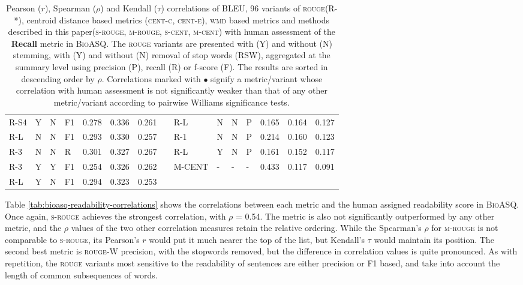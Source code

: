 \documentclass[11pt,a4paper]{article}
\newcommand{\rouge}{\textsc{rouge}\xspace}
\newcommand{\centc}{\textsc{cent-c}\xspace}
\newcommand{\cente}{\textsc{cent-e}\xspace}
\newcommand{\wmd}{\textsc{wmd}\xspace}
\newcommand{\bioasq}{\textsc{BioASQ}\xspace}
\newcommand{\srouge}{\textsc{s-rouge}\xspace}
\newcommand{\mrouge}{\textsc{m-rouge}\xspace}
\newcommand{\scent}{\textsc{s-cent}\xspace}
\newcommand{\mcent}{\textsc{m-cent}\xspace}
\begin{document}
\begin{table}[]
{\begin{tabular}{lllllllllllllll}
\textsc{R-S4} & Y & N & F1 & 0.278 & 0.336 & 0.261 &  & \textsc{R-L} & N & N & P & 0.165 & 0.164 & 0.127 \\
\textsc{R-L} & N & N & F1 & 0.293 & 0.330 & 0.257 &  & \textsc{R-1} & N & N & P & 0.214 & 0.160 & 0.123 \\
\textsc{R-3} & N & N & R & 0.301 & 0.327 & 0.267 &  & \textsc{R-L} & Y & N & P & 0.161 & 0.152 & 0.117 \\
\textsc{R-3} & Y & Y & F1 & 0.254 & 0.326 & 0.262 &  & \textsc{M-CENT} & - & - & - & 0.433 & 0.117 & 0.091 \\
\textsc{R-L} & Y & N & F1 & 0.294 & 0.323 & 0.253 &  &  &  &  &  &  &  &  \\ \hline
\end{tabular}
}
\caption{Pearson ($r$), Spearman ($\rho$) and Kendall ($\tau$) correlations of BLEU, 96 variants 
of \rouge (R-*), centroid distance based metrics (\centc, \cente), \wmd based metrics and 
methods described in this paper(\srouge, \mrouge, \scent, \mcent) with human assessment of the \textbf{Recall} metric in \bioasq. The \rouge 
variants are presented with (Y) and without (N) stemming, with (Y) and without (N) removal of 
stop words (RSW), aggregated at the summary level using precision (P), recall (R) or f-score (F).
The results are sorted in descending order by $\rho$. Correlations marked with $\bullet$ signify 
a metric/variant whose correlation with human assessment is not significantly weaker than that 
of any other metric/variant according to pairwise Williams significance tests.}
\label{tab:bioasq-recall-correlations}
\end{table}

Table \ref{tab:bioasq-readability-correlations} shows the correlations between each metric and the 
human assigned readability score in \bioasq. Once again, \srouge achieves the strongest correlation, 
with $\rho$ = 0.54. The metric is also not significantly outperformed by any other metric, 
and the $\rho$ values of the two other correlation measures retain the relative ordering. 
While the Spearman's $\rho$ for \mrouge is not comparable to \srouge, its Pearson's $r$ would 
put it much nearer the top of the list, but Kendall's $\tau$ would maintain its position. The 
second best metric is \rouge-W precision, with the stopwords removed, but the difference in 
correlation values is quite pronounced. As with repetition, the \rouge variants most sensitive 
to the readability of sentences are either precision or F1 based, and take into account 
the length of common subsequences of words.
\end{document}

